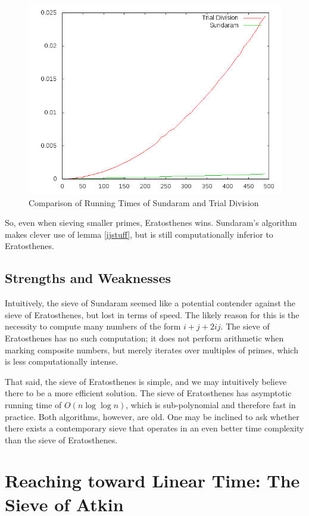 \documentclass{amsart}
\theoremstyle{definition}
\theoremstyle{case}
\begin{document}
	\begin{figure}\caption{Comparison of Running Times of Sundaram and Trial Division}
		\label{runtimetds}
		\includegraphics[scale=0.5]{sundiv.png}
	\end{figure}
	
	So, even when sieving smaller primes, Eratosthenes wins. Sundaram's algorithm makes clever use of lemma \ref{ijstuff}, but is still computationally inferior to Eratosthenes.
	
	\subsection{Strengths and Weaknesses}
	Intuitively, the sieve of Sundaram seemed like a potential contender against the sieve of Eratosthenes, but lost in terms of speed. The likely reason for this is the necessity to compute many numbers of the form $i+j+2ij$. The sieve of Eratosthenes has no such computation; it does not perform arithmetic when marking composite numbers, but merely iterates over multiples of primes, which is less computationally intense.
	
	That said, the sieve of Eratosthenes is simple, and we may intuitively believe there to be a more efficient solution. The sieve of Eratosthenes has asymptotic running time of $O(n \log \log n)$, which is sub-polynomial and therefore fast in practice. Both algorithms, however, are old. One may be inclined to ask whether there exists a contemporary sieve that operates in an even better time complexity than the sieve of Eratosthenes.

	\section{Reaching toward Linear Time: The Sieve of Atkin}
	
\end{document}
